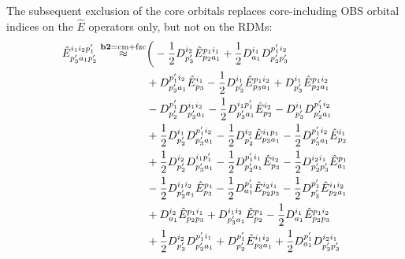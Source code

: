 \documentclass[aip,onecolumn,preprint]{revtex4-1}
\begin{document}
The subsequent exclusion of the core orbitals replaces core-including OBS orbital indices on the $\hat{E}$ operators only, but not on the RDMs:
 \begin{align}
 \label{eq:E3-b2}
\hat{E}_{p^{\prime}_{3}a_{1}p^{\prime}_{2}}^{i_1 i_2 p^{\prime}_1} \overset{\rm \mathbf{b2}=cm+fzc}{\approx}&  \bigg( - {{{\frac{1}{2}}}{D^{{i_2}}_{{p^{\prime}_3}}}{\hat{E}^{{p_1}{i_1}}_{{p_2}{a_1}}}} + {{{\frac{1}{2}}}{D^{{i_1}}_{{a_1}}}{D^{{p^{\prime}_1}{i_2}}_{{p^{\prime}_2}{p^{\prime}_3}}}} \nonumber \\
  & + {{D^{{p^{\prime}_1}{i_2}}_{{p^{\prime}_2}{a_1}}}{\hat{E}^{{i_1}}_{{p_3}}}} - {{{\frac{1}{2}}}{D^{{i_1}}_{{p^{\prime}_2}}}{\hat{E}^{{p_1}{i_2}}_{{p_3}{a_1}}}} + {{D^{{i_1}}_{{p^{\prime}_3}}}{\hat{E}^{{p_1}{i_2}}_{{p_2}{a_1}}}} \nonumber \\
  & - {{D^{{p^{\prime}_1}}_{{p^{\prime}_2}}}{D^{{i_1}{i_2}}_{{p^{\prime}_3}{a_1}}}} - {{{\frac{1}{2}}}{D^{{i_1}{p^{\prime}_1}}_{{p^{\prime}_3}{a_1}}}{\hat{E}^{{i_2}}_{{p_2}}}} - {{D^{{i_1}}_{{p^{\prime}_3}}}{D^{{p^{\prime}_1}{i_2}}_{{p^{\prime}_2}{a_1}}}} \nonumber \\
  & + {{{\frac{1}{2}}}{D^{{i_1}}_{{p^{\prime}_2}}}{D^{{p^{\prime}_1}{i_2}}_{{p^{\prime}_3}{a_1}}}} - {{{\frac{1}{2}}}{D^{{i_2}}_{{p^{\prime}_2}}}{\hat{E}^{{i_1}{p_1}}_{{p_3}{a_1}}}} - {{{\frac{1}{2}}}{D^{{p^{\prime}_1}{i_2}}_{{p^{\prime}_3}{a_1}}}{\hat{E}^{{i_1}}_{{p_2}}}} \nonumber \\
  & + {{{\frac{1}{2}}}{D^{{i_2}}_{{p^{\prime}_2}}}{D^{{i_1}{p^{\prime}_1}}_{{p^{\prime}_3}{a_1}}}} - {{{\frac{1}{2}}}{D^{{p^{\prime}_1}{i_1}}_{{p^{\prime}_2}{a_1}}}{\hat{E}^{{i_2}}_{{p_3}}}} - {{{\frac{1}{2}}}{D^{{i_2}{i_1}}_{{p^{\prime}_2}{p^{\prime}_3}}}{\hat{E}^{{p_1}}_{{a_1}}}} \nonumber \\
  & - {{{\frac{1}{2}}}{D^{{i_1}{i_2}}_{{p^{\prime}_2}{a_1}}}{\hat{E}^{{p_1}}_{{p_3}}}} - {{{\frac{1}{2}}}{D^{{p^{\prime}_1}}_{{a_1}}}{\hat{E}^{{i_2}{i_1}}_{{p_2}{p_3}}}} - {{{\frac{1}{2}}}{D^{{p^{\prime}_1}}_{{p^{\prime}_3}}}{\hat{E}^{{i_1}{i_2}}_{{p_2}{a_1}}}} \nonumber \\
  & + {{D^{{i_2}}_{{a_1}}}{\hat{E}^{{p_1}{i_1}}_{{p_2}{p_3}}}} + {{D^{{i_1}{i_2}}_{{p^{\prime}_3}{a_1}}}{\hat{E}^{{p_1}}_{{p_2}}}} - {{{\frac{1}{2}}}{D^{{i_1}}_{{a_1}}}{\hat{E}^{{p_1}{i_2}}_{{p_2}{p_3}}}} \nonumber \\
  & + {{{\frac{1}{2}}}{D^{{i_2}}_{{p^{\prime}_3}}}{D^{{p^{\prime}_1}{i_1}}_{{p^{\prime}_2}{a_1}}}} + {{D^{{p^{\prime}_1}}_{{p^{\prime}_2}}}{\hat{E}^{{i_1}{i_2}}_{{p_3}{a_1}}}} + {{{\frac{1}{2}}}{D^{{p^{\prime}_1}}_{{a_1}}}{D^{{i_2}{i_1}}_{{p^{\prime}_2}{p^{\prime}_3}}}} \nonumber \\

\end{align}
\end{document}
